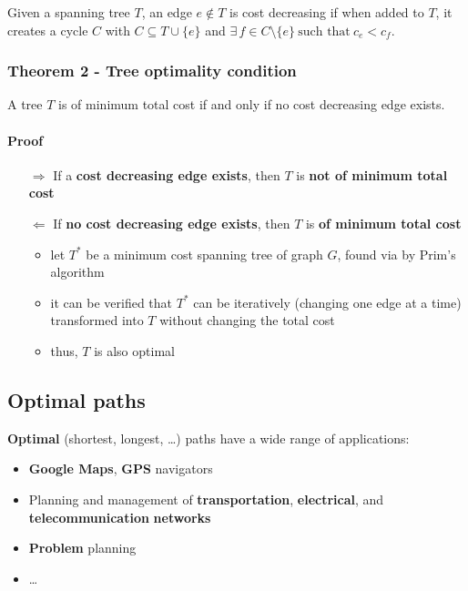 \documentclass[english]{article}
\begin{document}
Given a spanning tree \(T\), an edge \(e \notin T\) is cost decreasing if when added to \(T\), it creates a cycle \(C\) with \(C \subseteq T \cup \{e\}\) and \(\exists \, f \in C \setminus \{e\} \ \text{such that} \  c_e < c_f\).

\subsubsection{Theorem 2 - Tree optimality condition}

A tree \(T\) is of minimum total cost if and only if no cost decreasing edge exists.

\paragraph{Proof}

\begin{itemize}
  \item[\(\Rightarrow\)] If a \textbf{cost decreasing edge exists}, then \(T\) is \textbf{not of minimum total cost}
  \item[\(\Leftarrow\)] If \textbf{no cost decreasing edge exists}, then \(T\) is \textbf{of minimum total cost}
    \begin{itemize}
      \item let \(T^\ast\) be a minimum cost spanning tree of graph \(G\), found via by Prim's algorithm
      \item it can be verified that \(T^\ast\) can be iteratively (changing one edge at a time) transformed into \(T\) without changing the total cost
      \item thus, \(T\) is also optimal
    \end{itemize}
\end{itemize}

\subsection{Optimal paths}

\textbf{Optimal} (shortest, longest, \ldots) paths have a wide range of applications:

\begin{itemize}
  \item \textbf{Google Maps}, \textbf{GPS} navigators
  \item Planning and management of \textbf{transportation}, \textbf{electrical}, and \textbf{telecommunication} \textbf{networks}
  \item \textbf{Problem} planning
  \item \ldots
\end{itemize}
\end{document}

